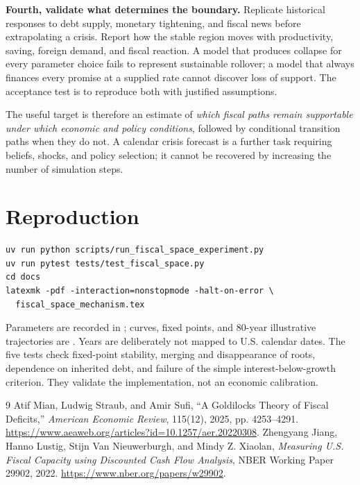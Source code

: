 \documentclass[11pt]{article}
\begin{document}
\textbf{Fourth, validate what determines the boundary.} Replicate historical responses to
debt supply, monetary tightening, and fiscal news before extrapolating a crisis. Report
how the stable region moves with productivity, saving, foreign demand, and fiscal reaction.
A model that produces collapse for every parameter choice fails to represent sustainable
rollover; a model that always finances every promise at a supplied rate cannot discover
loss of support. The acceptance test is to reproduce both with justified assumptions.

The useful target is therefore an estimate of \emph{which fiscal paths remain supportable
under which economic and policy conditions}, followed by conditional transition paths
when they do not. A calendar crisis forecast is a further task requiring beliefs, shocks,
and policy selection; it cannot be recovered by increasing the number of simulation steps.

\section*{Reproduction}

\begin{verbatim}
uv run python scripts/run_fiscal_space_experiment.py
uv run pytest tests/test_fiscal_space.py
cd docs
latexmk -pdf -interaction=nonstopmode -halt-on-error \
  fiscal_space_mechanism.tex
\end{verbatim}
Parameters are recorded in ;
curves, fixed points, and 80-year illustrative trajectories are
. Years are deliberately not mapped to U.S.
calendar dates. The five tests check fixed-point stability, merging and disappearance
of roots, dependence on inherited debt, and failure of the simple interest-below-growth
criterion. They validate the implementation, not an economic calibration.

\begin{thebibliography}{9}
Atif Mian, Ludwig Straub, and Amir Sufi, ``A Goldilocks Theory of Fiscal Deficits,''
\emph{American Economic Review}, 115(12), 2025, pp. 4253--4291.
\url{https://www.aeaweb.org/articles?id=10.1257/aer.20220308}.
Zhengyang Jiang, Hanno Lustig, Stijn Van Nieuwerburgh, and Mindy Z. Xiaolan,
\emph{Measuring U.S. Fiscal Capacity using Discounted Cash Flow Analysis},
NBER Working Paper 29902, 2022.
\url{https://www.nber.org/papers/w29902}.
\end{thebibliography}
\end{document}

